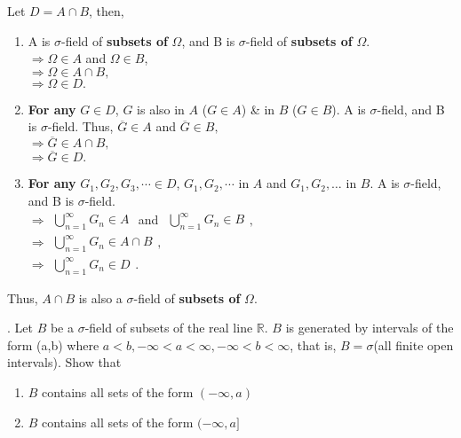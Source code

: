 \documentclass[12pt,thmsa]{article}
\begin{document}
Let \(D=A \cap B\), then,
\begin{enumerate}[label=\roman*)] %
	\item A is \(\sigma\)-field of \textbf{subsets of} \(\Omega\), and B is \(\sigma\)-field of \textbf{subsets of} \(\Omega\). \\
	\(\Rightarrow \Omega \in A\) and \(\Omega \in B\), \\
	\(\Rightarrow \Omega \in A \cap B,\) \\
	\(\Rightarrow \Omega \in D.\)
	\item \textbf{For any} \(G \in D\), \(G\) is also in \(A\) (\(G \in A\)) \& in \(B\) (\(G \in B\)). A is \(\sigma\)-field, and B is \(\sigma\)-field. Thus, \(\overline{G} \in A\) and \(\overline{G} \in B,\) \\
	\(\Rightarrow \overline{G} \in A \cap B,\) \\
	\(\Rightarrow \overline{G} \in D.\)
	\item \textbf{For any} \(G_{1}, G_{2}, G_{3}, \cdots \in D\), \(G_{1}, G_{2}, \cdots\) in \(A\) and \(G_{1}, G_{2}, \ldots\) in \(B\). A is \(\sigma\)-field, and B is \(\sigma\)-field. \\
	\(\Rightarrow \begin{aligned}\bigcup_{n=1}^{\infty} G_{n} \in A\end{aligned}\) and \(\begin{aligned}\bigcup_{n=1}^{\infty} G_{n} \in B\end{aligned},\) \\
	\(\Rightarrow  \begin{aligned}\bigcup_{n=1}^{\infty} G_{n} \in A \cap B\end{aligned},\) \\
	\(\Rightarrow \begin{aligned}\bigcup_{n=1}^{\infty} G_{n} \in D\end{aligned}.\)
\end{enumerate}

Thus, \(A \cap B\) is also a \(\sigma\)-field of \textbf{subsets of} \(\Omega\).

\medskip


. Let \(B\) be a \(\sigma\)-field of subsets of the real line \(\mathbb{R}\). \(B\) is generated by intervals of the form (a,b) where \(a<b, -\infty<a<\infty, -\infty<b<\infty\), that is, \(B=\sigma\)(all finite open intervals). Show that
\begin{enumerate}[label=\alph*)] %
	\item \(B\) contains all sets of the form \((-\infty, a)\)
	
	\item \(B\) contains all sets of the form \((-\infty, a]\)
\end{enumerate}
\end{document}
